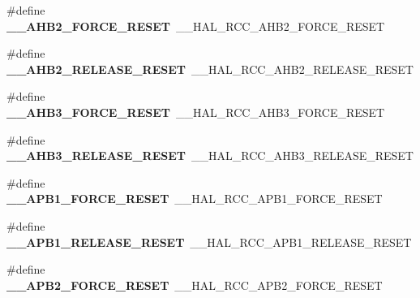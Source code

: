 \begin{DoxyCompactItemize}
\item 
\#define {\bfseries \+\_\+\+\_\+\+A\+H\+B2\+\_\+\+F\+O\+R\+C\+E\+\_\+\+R\+E\+S\+ET}~\+\_\+\+\_\+\+H\+A\+L\+\_\+\+R\+C\+C\+\_\+\+A\+H\+B2\+\_\+\+F\+O\+R\+C\+E\+\_\+\+R\+E\+S\+ET\hypertarget{group___h_a_l___r_c_c___aliased_gabf07e4804f7486e35e0f0054675fab77}{}\label{group___h_a_l___r_c_c___aliased_gabf07e4804f7486e35e0f0054675fab77}

\item 
\#define {\bfseries \+\_\+\+\_\+\+A\+H\+B2\+\_\+\+R\+E\+L\+E\+A\+S\+E\+\_\+\+R\+E\+S\+ET}~\+\_\+\+\_\+\+H\+A\+L\+\_\+\+R\+C\+C\+\_\+\+A\+H\+B2\+\_\+\+R\+E\+L\+E\+A\+S\+E\+\_\+\+R\+E\+S\+ET\hypertarget{group___h_a_l___r_c_c___aliased_ga9757b88e34916ad449503457d065b844}{}\label{group___h_a_l___r_c_c___aliased_ga9757b88e34916ad449503457d065b844}

\item 
\#define {\bfseries \+\_\+\+\_\+\+A\+H\+B3\+\_\+\+F\+O\+R\+C\+E\+\_\+\+R\+E\+S\+ET}~\+\_\+\+\_\+\+H\+A\+L\+\_\+\+R\+C\+C\+\_\+\+A\+H\+B3\+\_\+\+F\+O\+R\+C\+E\+\_\+\+R\+E\+S\+ET\hypertarget{group___h_a_l___r_c_c___aliased_ga967e453f7a2dc917a2f43041bc3530bc}{}\label{group___h_a_l___r_c_c___aliased_ga967e453f7a2dc917a2f43041bc3530bc}

\item 
\#define {\bfseries \+\_\+\+\_\+\+A\+H\+B3\+\_\+\+R\+E\+L\+E\+A\+S\+E\+\_\+\+R\+E\+S\+ET}~\+\_\+\+\_\+\+H\+A\+L\+\_\+\+R\+C\+C\+\_\+\+A\+H\+B3\+\_\+\+R\+E\+L\+E\+A\+S\+E\+\_\+\+R\+E\+S\+ET\hypertarget{group___h_a_l___r_c_c___aliased_gacf2ccc00726b7722836cddb8f42db97c}{}\label{group___h_a_l___r_c_c___aliased_gacf2ccc00726b7722836cddb8f42db97c}

\item 
\#define {\bfseries \+\_\+\+\_\+\+A\+P\+B1\+\_\+\+F\+O\+R\+C\+E\+\_\+\+R\+E\+S\+ET}~\+\_\+\+\_\+\+H\+A\+L\+\_\+\+R\+C\+C\+\_\+\+A\+P\+B1\+\_\+\+F\+O\+R\+C\+E\+\_\+\+R\+E\+S\+ET\hypertarget{group___h_a_l___r_c_c___aliased_gad52dd8358580ee80c5d66fb0ae3208fa}{}\label{group___h_a_l___r_c_c___aliased_gad52dd8358580ee80c5d66fb0ae3208fa}

\item 
\#define {\bfseries \+\_\+\+\_\+\+A\+P\+B1\+\_\+\+R\+E\+L\+E\+A\+S\+E\+\_\+\+R\+E\+S\+ET}~\+\_\+\+\_\+\+H\+A\+L\+\_\+\+R\+C\+C\+\_\+\+A\+P\+B1\+\_\+\+R\+E\+L\+E\+A\+S\+E\+\_\+\+R\+E\+S\+ET\hypertarget{group___h_a_l___r_c_c___aliased_ga497e83304224dd4740b388fe296beaf0}{}\label{group___h_a_l___r_c_c___aliased_ga497e83304224dd4740b388fe296beaf0}

\item 
\#define {\bfseries \+\_\+\+\_\+\+A\+P\+B2\+\_\+\+F\+O\+R\+C\+E\+\_\+\+R\+E\+S\+ET}~\+\_\+\+\_\+\+H\+A\+L\+\_\+\+R\+C\+C\+\_\+\+A\+P\+B2\+\_\+\+F\+O\+R\+C\+E\+\_\+\+R\+E\+S\+ET\hypertarget{group___h_a_l___r_c_c___aliased_ga92a0e6fcc37827864d686e5d023d8472}{}\label{group___h_a_l___r_c_c___aliased_ga92a0e6fcc37827864d686e5d023d8472}


\end{DoxyCompactItemize}
